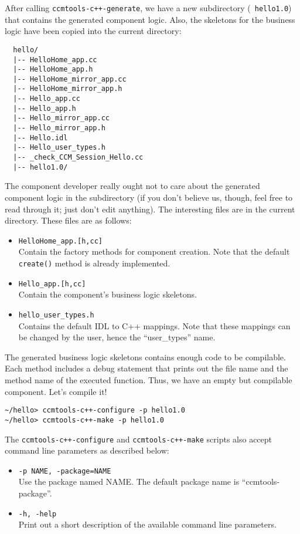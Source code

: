 After calling {\tt ccmtools-c++-generate}, we have a new subdirectory ({\tt
hello1.0}) that contains the generated component logic. Also, the skeletons for
the business logic have been copied into the current directory:
\begin{small}
\begin{verbatim}
  hello/
  |-- HelloHome_app.cc
  |-- HelloHome_app.h
  |-- HelloHome_mirror_app.cc
  |-- HelloHome_mirror_app.h
  |-- Hello_app.cc
  |-- Hello_app.h
  |-- Hello_mirror_app.cc
  |-- Hello_mirror_app.h
  |-- Hello.idl
  |-- Hello_user_types.h
  |-- _check_CCM_Session_Hello.cc
  |-- hello1.0/
\end{verbatim}
\end{small}

The component developer really ought not to care about the generated component
logic in the subdirectory (if you don't believe us, though, feel free to read
through it; just don't edit anything). The interesting files are in the current
directory. These files are as follows:
\begin{itemize}
\item {\tt HelloHome\_app.[h,cc]} \\
Contain the factory methods for component creation. Note that the default {\tt
create()} method is already implemented.
\item {\tt Hello\_app.[h,cc]} \\
Contain the component's business logic skeletons.
\item {\tt hello\_user\_types.h} \\
Contains the default IDL to C++ mappings. Note that these mappings can be
changed by the user, hence the ``user\_types'' name.
\end{itemize}

The generated business logic skeletons contains enough code to be compilable.
Each method includes a debug statement that prints out the file name and the method name of
the executed function. Thus, we have an empty but compilable component. Let's
compile it!
\begin{small}
\begin{verbatim}
~/hello> ccmtools-c++-configure -p hello1.0
~/hello> ccmtools-c++-make -p hello1.0
\end{verbatim}
\end{small}

The {\tt ccmtools-c++-configure} and {\tt ccmtools-c++-make} scripts also accept 
command line parameters as described below:
\begin{itemize}
\item {\tt -p NAME, -\-package=NAME}\\
Use the package named NAME. The default package name is ``ccmtools-package''.

\item {\tt -h, -\-help}\\
Print out a short description of the available command line parameters.
\end{itemize}

